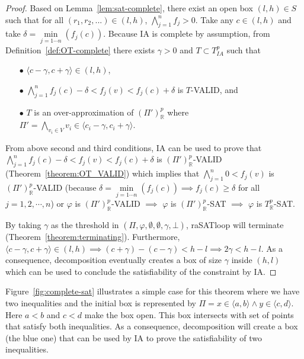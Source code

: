\begin{proof}
Based on Lemma~\ref{lem:sat-complete}, there exist an open box $(l, h) \in S$ such that for all $(r_1, r_2, ...) \in (l, h)$, $\bigwedge\limits_{j=1}^n f_j > 0 $. Take any $c \in (l, h)$ and take $\delta = \min\limits_{j = 1\cdots n}(f_j(c))$. Because IA is complete by assumption, from Definition~\ref{def:OT-complete} there exists $\gamma > 0$ and $T \subset T^p_{IA}$ such that
\begin{itemize}
\item[$\bullet$] ${\langle c - \gamma, c + \gamma \rangle \in (l, h)}$,
\item[$\bullet$] $\bigwedge\limits_{j = 1}^n f_j(c) - \delta < f_j(v) < f_j(c) + \delta$ is $T$-VALID, and
\item [$\bullet$] $T$ is an over-approximation of $(\Pi')^p_\mathbb{R}$ where $\Pi' = \bigwedge\limits_{v_i \in V}v_i \in \langle c_i - \gamma, c_i + \gamma \rangle$.
\end{itemize}
From above second and third conditions, IA can be used to prove that $\bigwedge\limits_{j = 1}^n f_j(c) - \delta < f_j(v) < f_j(c) + \delta$ is $(\Pi')^p_\mathbb{R}$-VALID (Theorem~\ref{theorem:OT_VALID}) which implies that ${\bigwedge\limits_{j = 1}^n 0 < f_j(v)}$ is $(\Pi')^p_\mathbb{R}$-VALID (because ${\delta = \min\limits_{j = 1\cdots n}(f_j(c)) \implies f_j(c) \ge \delta}$ for all $j = 1, 2, \cdots, n$) or $\varphi$ is $(\Pi')^p_\mathbb{R}$-VALID $\implies$ $\varphi$ is $(\Pi')^p_\mathbb{R}$-SAT $\implies$ $\varphi$ is $T^p_\mathbb{R}$-SAT.

By taking $\gamma$ as the threshold in $(\Pi, \varphi, \emptyset, \emptyset, \gamma, \bot)$, raSATloop will terminate (Theorem~\ref{theorem:terminating}). Furthermore, $\langle c - \gamma, c + \gamma \rangle \in (l, h) \implies (c + \gamma) - (c - \gamma) < h - l \implies 2\gamma < h - l$. As a consequence, decomposition eventually creates a box of size $\gamma$ inside $(h, l)$ which can be used to conclude the satisfiability of the constraint by IA.
\end{proof}

Figure~\ref{fig:complete-sat} illustrates a simple case for this theorem where we have two inequalities and the initial box is represented by $\Pi = x \in \langle a, b \rangle \wedge y \in \langle c, d \rangle$. Here $a < b$ and $c < d$ make the box open. This box intersects with set of points that satisfy both inequalities. As a consequence, decomposition will create a box (the blue one) that can be used by IA to prove the satisfiability of two inequalities.


